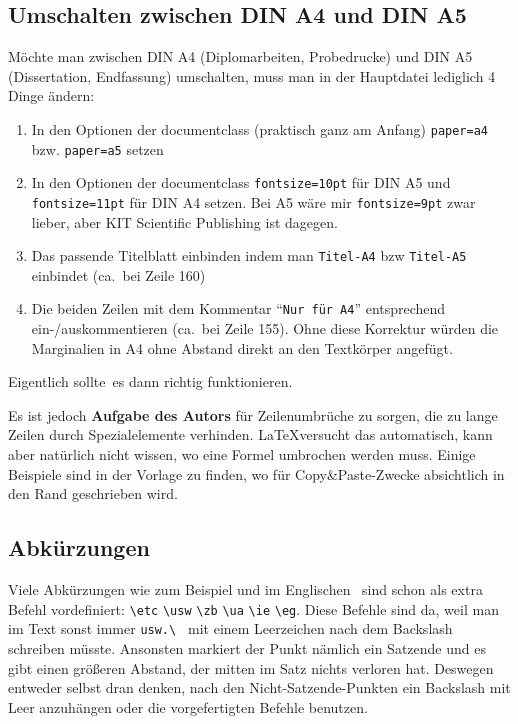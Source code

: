 \subsection{Umschalten zwischen DIN A4 und DIN A5}

Möchte man zwischen DIN A4 (Diplomarbeiten, Probedrucke) und DIN A5 (Dissertation, Endfassung) umschalten, muss man in der Hauptdatei lediglich 4 Dinge ändern:
\begin{enumerate}
	\item In den Optionen der documentclass (praktisch ganz am Anfang) \texttt{paper=a4} bzw. \texttt{paper=a5} setzen
	\item In den Optionen der documentclass \texttt{fontsize=10pt} für DIN A5 und \texttt{fontsize=11pt} für DIN A4 setzen. Bei A5 wäre mir \texttt{fontsize=9pt} zwar lieber, aber KIT Scientific Publishing ist dagegen.
	\item Das passende Titelblatt einbinden indem man \texttt{Titel-A4} bzw \texttt{Titel-A5} einbindet (ca.\ bei Zeile 160)
	\item Die beiden Zeilen mit dem Kommentar "`\texttt{Nur für A4}"' entsprechend ein-/auskommentieren (ca.\ bei Zeile 155). Ohne diese Korrektur würden die Marginalien in A4 ohne Abstand direkt an den Textkörper angefügt.
\end{enumerate}
Eigentlich sollte\texttrademark\ es dann richtig funktionieren.

Es ist jedoch \textbf{Aufgabe des Autors} für Zeilenumbrüche zu sorgen, die zu lange Zeilen durch Spezialelemente verhinden. \LaTeX versucht das automatisch, kann aber natürlich nicht wissen, wo \zb eine Formel umbrochen werden muss. Einige Beispiele sind in der Vorlage zu finden, wo für Copy\&Paste-Zwecke absichtlich in den Rand geschrieben wird.

\subsection{Abkürzungen}
Viele Abkürzungen wie zum Beispiel \etc \zb \usw \ua und im Englischen \ie\ \eg sind schon als extra Befehl vordefiniert: \verb+\etc+ \verb+\usw+ \verb+\zb+ \verb+\ua+ \verb+\ie+ \verb+\eg+. Diese Befehle sind da, weil man im Text sonst immer \verb+usw.\ + mit einem Leerzeichen nach dem Backslash schreiben müsste. Ansonsten markiert der Punkt nämlich ein Satzende und es gibt einen größeren Abstand, der mitten im Satz nichts verloren hat. Deswegen entweder selbst dran denken, nach den Nicht-Satzende-Punkten ein Backslash mit Leer anzuhängen oder die vorgefertigten Befehle benutzen.


